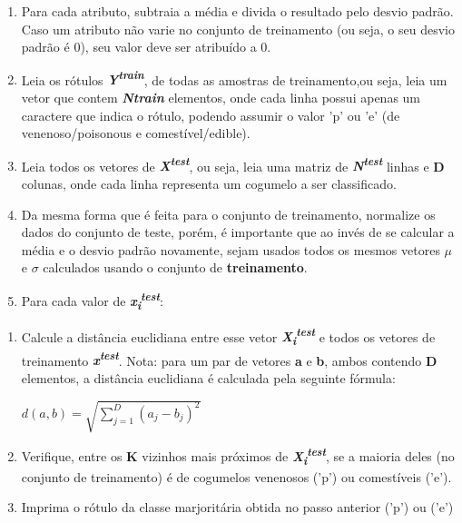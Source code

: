 \documentclass{article}
\begin{document}
\begin{enumerate}
\item Para cada atributo, subtraia a média e divida o resultado pelo desvio padrão. Caso um atributo não varie no conjunto de treinamento (ou seja, o seu desvio padrão é 0), seu valor deve ser atribuído a 0.
\item Leia os rótulos \textbf{\emph{Y\textsuperscript{train}}}, de todas as amostras de treinamento,ou seja, leia um vetor que contem \textbf{\emph{Ntrain}} elementos, onde cada linha possui apenas um caractere que indica o rótulo, podendo assumir o valor 'p' ou 'e' (de venenoso/poisonous e comestível/edible).
\item Leia todos os vetores de \textbf{\emph{X\textsuperscript{test}}}, ou seja, leia uma matriz de \textbf{\emph{N\textsuperscript{test}}} linhas e \textbf{D} colunas, onde cada linha representa um cogumelo a ser classificado.
\item Da mesma forma que é feita para o conjunto de treinamento, normalize os dados do conjunto de teste, porém, é importante que ao invés de se calcular a média e o desvio padrão novamente, sejam usados todos os mesmos vetores \textbf{$\mu$} e \textbf{$\sigma$} calculados usando o conjunto de \textbf{treinamento}.
\item Para cada valor de \textbf{\emph{x\textsubscript{i}\textsuperscript{test}}}: 
\end{enumerate}
              
\begin{enumerate}
\item Calcule a distância euclidiana entre esse vetor \textbf{\emph{X\textsubscript{i}\textsuperscript{test}}} e todos os vetores de treinamento \textbf{\emph{x\textsuperscript{test}}}. Nota: para um par de vetores \textbf{a} e \textbf{b}, ambos contendo \textbf{D} elementos, a distância euclidiana é calculada pela seguinte fórmula:

$ d(a,b) = \sqrt{\sum\limits_{j=1}^{D} (a_{j} - b_{j} )^{2}}$

\item Verifique, entre os \textbf{K} vizinhos mais próximos de \textbf{\emph{X\textsubscript{i}\textsuperscript{test}}}, se a maioria deles (no conjunto de treinamento) é de cogumelos venenosos ('p') ou comestíveis ('e').
\item Imprima o rótulo da classe marjoritária obtida no passo anterior ('p') ou ('e')
\end{enumerate}
\end{document}

